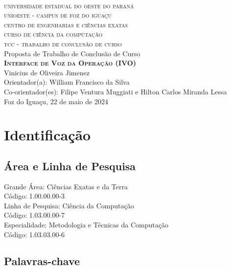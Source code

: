 \documentclass[
	12pt,				%
	a4paper,			%
	english,			%
	brazil,				%
	]{article}
\begin{document}
\begin{center}

	\textsc{
		\large
			\\universidade estadual do oeste do paraná
			\\unioeste - campus de foz do iguaçu
			\\centro de engenharias e ciências exatas
			\\curso de ciência da computação
			\\[1 cm]tcc - trabalho de conclusão de curso
	}
	\\
	[4 cm]
	\large Proposta de Trabalho de Conclusão de Curso
    \\
	\textbf{
	    \textsc{Interface de Voz da Operação (IVO)}
    }
	\\[5 cm]Vinicius de Oliveira Jimenez
    \\Orientador(a): William Francisco da Silva
    \\Co-orientador(es): Filipe Ventura Muggiati e Hilton Carlos Miranda Lessa
    \\[2 cm]Foz do Iguaçu, 22 de maio de 2024
    
    
\end{center}

\thispagestyle{empty}

\section{Identificação}
    
    \subsection{Área e Linha de Pesquisa} 
    
        \noindent Grande Área: Ciências Exatas e da Terra
        \\Código: 1.00.00.00-3 
    	\\[1 cm]Linha de Pesquisa: Ciência da Computação
    	\\Código: 1.03.00.00-7
    	\\[1 cm]Especialidade: Metodologia e Técnicas da Computação
    	\\Código: 1.03.03.00-6 
    	
    	
    \subsection{Palavras-chave}
\end{document}
